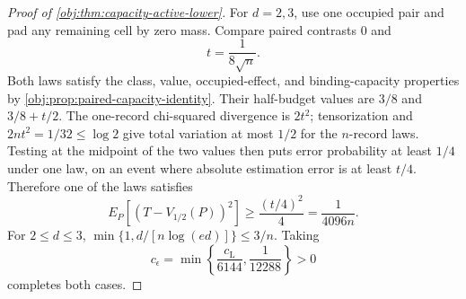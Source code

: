 \begin{proof}[Proof of \cref{obj:thm:capacity-active-lower}]
For \(d=2,3\), use one occupied pair and pad any remaining cell by zero mass. Compare paired contrasts \(0\) and
\[
t=\frac1{8\sqrt n}.
\] %
Both laws satisfy the class, value, occupied-effect, and binding-capacity properties by \cref{obj:prop:paired-capacity-identity}. Their half-budget values are \(3/8\) and \(3/8+t/2\). The one-record chi-squared divergence is \(2t^2\); tensorization and \(2nt^2=1/32\le\log2\) give total variation at most \(1/2\) for the \(n\)-record laws. Testing at the midpoint of the two values then puts error probability at least \(1/4\) under one law, on an event where absolute estimation error is at least \(t/4\). Therefore one of the laws satisfies
\[
E_P\!\left[(T-V_{1/2}(P))^2\right]
\ge\frac{(t/4)^2}{4}
=\frac1{4096n}.
\] %
For \(2\le d\le3\), \(\min\{1,d/[n\log(ed)]\}\le3/n\). Taking
\[
c_\epsilon=\min\left\{\frac{c_{\mathrm L}}{6144},
                         \frac1{12288}\right\}>0
\] %
completes both cases. %
\end{proof}

